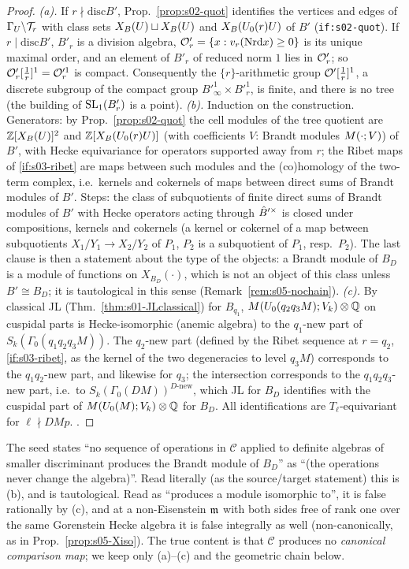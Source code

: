 \begin{proof}
\emph{(a).} If $r\nmid\mathrm{disc}B'$, Prop.~\ref{prop:s02-quot} identifies the vertices and edges of $\Gamma_U\backslash\mathcal{T}_r$ with class sets
$X_B(U)\sqcup X_B(U)$ and $X_B(U_0(r)U)$ of $B'$ (\texttt{if:s02-quot}). If $r\mid\mathrm{disc}B'$, $B'_r$ is a division algebra, $\mathcal{O}'_r=\{x:v_r(\mathrm{Nrd} x)\ge0\}$
is its unique maximal order, and an element of $B'_r$ of reduced norm $1$ lies in $\mathcal{O}'_r$; so $\mathcal{O}'_r[\frac1r]^1=\mathcal{O}'^1_r$ is compact. Consequently the
$\{r\}$-arithmetic group $\mathcal{O}'[\frac1r]^1$, a discrete subgroup of the compact group $B'^1_\infty\times B'^1_r$, is finite, and there is no
tree (the building of $\mathrm{SL}_1(B'_r)$ is a point).
\emph{(b).} Induction on the construction. Generators: by Prop.~\ref{prop:s02-quot} the cell modules of the tree quotient are
$\mathbb{Z}[X_B(U)]^2$ and $\mathbb{Z}[X_B(U_0(r)U)]$ (with coefficients $V$: Brandt modules $M(\cdot;V)$) of $B'$, with Hecke equivariance for
operators supported away from $r$; the Ribet maps of \ref{if:s03-ribet} are maps between such modules and the (co)homology of the
two-term complex, i.e.\ kernels and cokernels of maps between direct sums of Brandt modules of $B'$. Steps: the class of subquotients of
finite direct sums of Brandt modules of $B'$ with Hecke operators acting through $\hat{B}'^\times$ is closed under compositions, kernels and
cokernels (a kernel or cokernel of a map between subquotients $X_1/Y_1\to X_2/Y_2$ of $P_1$, $P_2$ is a subquotient of $P_1$, resp.\ $P_2$).
The last clause is then a statement about the type of the objects: a Brandt module of $B_D$ is a module of functions on
$X_{B_D}(\cdot)$, which is not an object of this class unless $B'\cong B_D$; it is tautological in this sense (Remark~\ref{rem:s05-nochain}).
\emph{(c).} By classical JL (Thm.~\ref{thm:s01-JLclassical}) for $B_{q_1}$, $M(U_0(q_2q_3M);V_k)\otimes\mathbb{Q}$ on cuspidal parts is
Hecke-isomorphic (anemic algebra) to the $q_1$-new part of $S_k(\Gamma_0(q_1q_2q_3M))$. The $q_2$-new part (defined by the Ribet sequence at
$r=q_2$, \ref{if:s03-ribet}, as the kernel of the two degeneracies to level $q_3M$) corresponds to the $q_1q_2$-new part, and likewise for
$q_3$; the intersection corresponds to the $q_1q_2q_3$-new part, i.e.\ to $S_k(\Gamma_0(DM))^{D\text{-new}}$, which JL for $B_D$ identifies with the
cuspidal part of $M(U_0(M);V_k)\otimes\mathbb{Q}$ for $B_D$. All identifications are $T_\ell$-equivariant for $\ell\nmid DMp$. \stpmc.
\end{proof}
\begin{remark}\label{rem:s05-nochain}
The seed states ``no sequence of operations in $\mathcal C$ applied to definite algebras of smaller discriminant produces the Brandt
module of $B_D$'' as \stproved{} ``(the operations never change the algebra)''. Read literally (as the source/target statement) this is
(b), and is tautological. Read as ``produces a module isomorphic to'', it is false rationally by (c), and at a non-Eisenstein $\mathfrak{m}$ with both
sides free of rank one over the same Gorenstein Hecke algebra it is false integrally as well (non-canonically, as in
Prop.~\ref{prop:s05-Xiso}). The true content is that $\mathcal C$ produces no \emph{canonical comparison map}; we keep only (a)--(c) and the
geometric chain below.
\end{remark}
